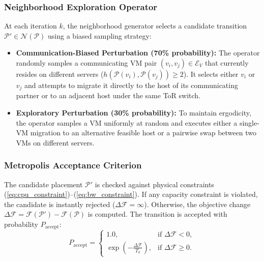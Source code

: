 \documentclass[conference]{IEEEtran}
\begin{document}
\subsubsection{Neighborhood Exploration Operator}
At each iteration $k$, the neighborhood generator selects a candidate transition $\mathcal{P}' \in \mathcal{N}(\mathcal{P})$ using a biased sampling strategy:
\begin{itemize}
    \item \textbf{Communication-Biased Perturbation (70\% probability):} The operator randomly samples a communicating VM pair $(v_i, v_j) \in \mathcal{E}_V$ that currently resides on different servers ($h(\mathcal{P}(v_i), \mathcal{P}(v_j)) \ge 2$). It selects either $v_i$ or $v_j$ and attempts to migrate it directly to the host of its communicating partner or to an adjacent host under the same ToR switch.
    \item \textbf{Exploratory Perturbation (30\% probability):} To maintain ergodicity, the operator samples a VM uniformly at random and executes either a single-VM migration to an alternative feasible host or a pairwise swap between two VMs on different servers.
\end{itemize}

\subsubsection{Metropolis Acceptance Criterion}
The candidate placement $\mathcal{P}'$ is checked against physical constraints (\ref{eq:cpu_constraint})--(\ref{eq:bw_constraint}). If any capacity constraint is violated, the candidate is instantly rejected ($\Delta \mathcal{F} = \infty$). Otherwise, the objective change $\Delta \mathcal{F} = \mathcal{F}(\mathcal{P}') - \mathcal{F}(\mathcal{P})$ is computed. The transition is accepted with probability $P_{\mathrm{accept}}$:
\begin{equation}
P_{\mathrm{accept}} = 
\begin{cases}
1.0, & \text{if } \Delta \mathcal{F} < 0, \\
\exp\left(-\frac{\Delta \mathcal{F}}{T_k}\right), & \text{if } \Delta \mathcal{F} \ge 0.
\end{cases}
\end{equation}
\end{document}
